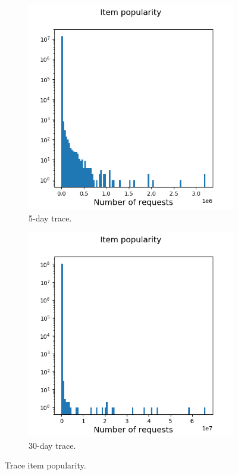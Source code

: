 \begin{figure}[h!]
	\centering
	
	\begin{subfigure}[b]{0.49\linewidth}
		\includegraphics[width=\linewidth]{pics/real_item_pop.png}
		\caption{5-day trace.}
	\end{subfigure}
	\begin{subfigure}[b]{0.49\linewidth}
		\includegraphics[width=\linewidth]{pics/real2_item_pop.png}
		\caption{30-day trace.}
	\end{subfigure}
	\caption{Trace item popularity.}
	\label{fig:pop_1}
\end{figure}

